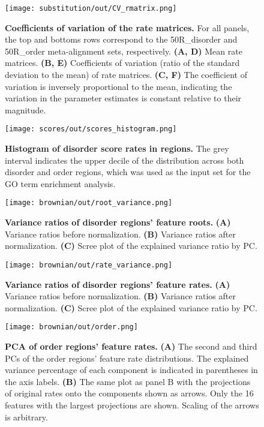 \begin{figure}[h!]
\texttt{[image: substitution/out/CV\_rmatrix.png]}
\centering
\caption{\textbf{Coefficients of variation of the rate matrices.}
For all panels, the top and bottoms rows correspond to the 50R\_disorder and 50R\_order meta-alignment sets, respectively. \textbf{(A, D)} Mean rate matrices. \textbf{(B, E)} Coefficients of variation (ratio of the standard deviation to the mean) of rate matrices. \textbf{(C, F)} The coefficient of variation is inversely proportional to the mean, indicating the variation in the parameter estimates is constant relative to their magnitude.}
\label{sfig:CV_rmatrix}
\end{figure}

\begin{figure}[h!]
\texttt{[image: scores/out/scores\_histogram.png]}
\centering
\caption{\textbf{Histogram of disorder score rates in regions.}
The grey interval indicates the upper decile of the distribution across both disorder and order regions, which was used as the input set for the GO term enrichment analysis.}
\label{sfig:scores_histogram}
\end{figure}

\begin{figure}[h!]
\texttt{[image: brownian/out/root\_variance.png]}
\centering
\caption{\textbf{Variance ratios of disorder regions' feature roots.}
\textbf{(A)} Variance ratios before normalization. \textbf{(B)} Variance ratios after normalization. \textbf{(C)} Scree plot of the explained variance ratio by PC.}
\label{sfig:root_variance}
\end{figure}

\begin{figure}[h!]
\texttt{[image: brownian/out/rate\_variance.png]}
\centering
\caption{\textbf{Variance ratios of disorder regions' feature rates.}
\textbf{(A)} Variance ratios before normalization. \textbf{(B)} Variance ratios after normalization. \textbf{(C)} Scree plot of the explained variance ratio by PC.}
\label{sfig:rate_variance}
\end{figure}

\begin{figure}[h!]
\texttt{[image: brownian/out/order.png]}
\centering
\caption{\textbf{PCA of order regions' feature rates.}
\textbf{(A)} The second and third PCs of the order regions' feature rate distributions. The explained variance percentage of each component is indicated in parentheses in the axis labels. \textbf{(B)} The same plot as panel B with the projections of original rates onto the components shown as arrows. Only the 16 features with the largest projections are shown. Scaling of the arrows is arbitrary.}
\label{sfig:order}
\end{figure}

